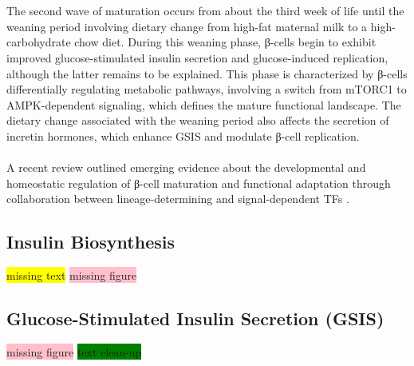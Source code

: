 \\\\
The second wave of maturation occurs from about the third week of life until the weaning period involving dietary change from high-fat maternal milk to a high-carbohydrate chow diet. During this weaning phase, β-cells begin to exhibit improved glucose-stimulated insulin secretion and glucose-induced replication, although the latter remains to be explained. This phase is characterized by β-cells differentially regulating metabolic pathways, involving a switch from mTORC1 to AMPK-dependent signaling, which defines the mature functional landscape. The dietary change associated with the weaning period also affects the secretion of incretin hormones, which enhance GSIS and modulate β-cell replication.\\\\
A recent review outlined emerging evidence about the developmental and homeostatic regulation of β-cell maturation and functional adaptation through collaboration between lineage-determining and signal-dependent TFs \textbf{\cite{wortham_transcriptional_2021}}.
\subsection{Insulin Biosynthesis} %
\label{sec:insbio}

\colorbox{yellow}{missing text} \colorbox{pink}{missing figure}


\subsection{Glucose-Stimulated Insulin Secretion (GSIS)} %
\label{sec:gsis}

\colorbox{pink}{missing figure} \colorbox{green}{text clean-up} \\

